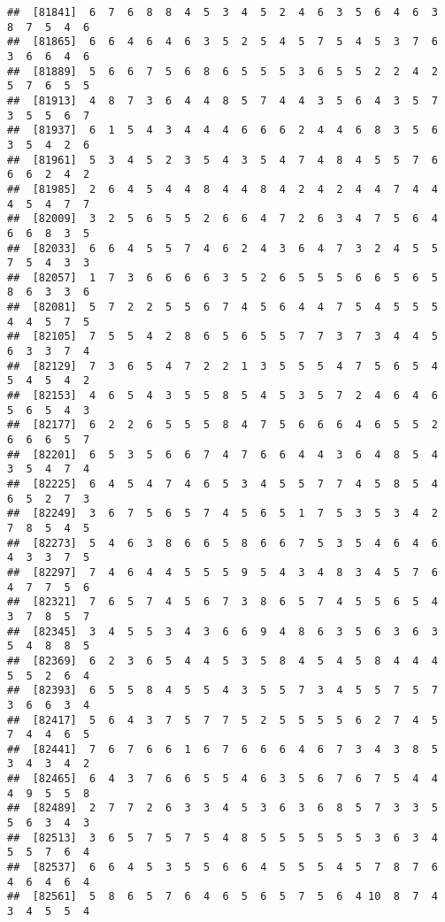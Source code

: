 \documentclass[
]{book}
\begin{document}
\begin{verbatim}
##  [81841]  6  7  6  8  8  4  5  3  4  5  2  4  6  3  5  6  4  6  3  8  7  5  4  6
##  [81865]  6  6  4  6  4  6  3  5  2  5  4  5  7  5  4  5  3  7  6  3  6  6  4  6
##  [81889]  5  6  6  7  5  6  8  6  5  5  5  3  6  5  5  2  2  4  2  5  7  6  5  5
##  [81913]  4  8  7  3  6  4  4  8  5  7  4  4  3  5  6  4  3  5  7  3  5  5  6  7
##  [81937]  6  1  5  4  3  4  4  4  6  6  6  2  4  4  6  8  3  5  6  3  5  4  2  6
##  [81961]  5  3  4  5  2  3  5  4  3  5  4  7  4  8  4  5  5  7  6  6  6  2  4  2
##  [81985]  2  6  4  5  4  4  8  4  4  8  4  2  4  2  4  4  7  4  4  4  5  4  7  7
##  [82009]  3  2  5  6  5  5  2  6  6  4  7  2  6  3  4  7  5  6  4  6  6  8  3  5
##  [82033]  6  6  4  5  5  7  4  6  2  4  3  6  4  7  3  2  4  5  5  7  5  4  3  3
##  [82057]  1  7  3  6  6  6  6  3  5  2  6  5  5  5  6  6  5  6  5  8  6  3  3  6
##  [82081]  5  7  2  2  5  5  6  7  4  5  6  4  4  7  5  4  5  5  5  4  4  5  7  5
##  [82105]  7  5  5  4  2  8  6  5  6  5  5  7  7  3  7  3  4  4  5  6  3  3  7  4
##  [82129]  7  3  6  5  4  7  2  2  1  3  5  5  5  4  7  5  6  5  4  5  4  5  4  2
##  [82153]  4  6  5  4  3  5  5  8  5  4  5  3  5  7  2  4  6  4  6  5  6  5  4  3
##  [82177]  6  2  2  6  5  5  5  8  4  7  5  6  6  6  4  6  5  5  2  6  6  6  5  7
##  [82201]  6  5  3  5  6  6  7  4  7  6  6  4  4  3  6  4  8  5  4  3  5  4  7  4
##  [82225]  6  4  5  4  7  4  6  5  3  4  5  5  7  7  4  5  8  5  4  6  5  2  7  3
##  [82249]  3  6  7  5  6  5  7  4  5  6  5  1  7  5  3  5  3  4  2  7  8  5  4  5
##  [82273]  5  4  6  3  8  6  6  5  8  6  6  7  5  3  5  4  6  4  6  4  3  3  7  5
##  [82297]  7  4  6  4  4  5  5  5  9  5  4  3  4  8  3  4  5  7  6  4  7  7  5  6
##  [82321]  7  6  5  7  4  5  6  7  3  8  6  5  7  4  5  5  6  5  4  3  7  8  5  7
##  [82345]  3  4  5  5  3  4  3  6  6  9  4  8  6  3  5  6  3  6  3  5  4  8  8  5
##  [82369]  6  2  3  6  5  4  4  5  3  5  8  4  5  4  5  8  4  4  4  5  5  2  6  4
##  [82393]  6  5  5  8  4  5  5  4  3  5  5  7  3  4  5  5  7  5  7  3  6  6  3  4
##  [82417]  5  6  4  3  7  5  7  7  5  2  5  5  5  5  6  2  7  4  5  7  4  4  6  5
##  [82441]  7  6  7  6  6  1  6  7  6  6  6  4  6  7  3  4  3  8  5  3  4  3  4  2
##  [82465]  6  4  3  7  6  6  5  5  4  6  3  5  6  7  6  7  5  4  4  4  9  5  5  8
##  [82489]  2  7  7  2  6  3  3  4  5  3  6  3  6  8  5  7  3  3  5  5  6  3  4  3
##  [82513]  3  6  5  7  5  7  5  4  8  5  5  5  5  5  5  3  6  3  4  5  5  7  6  4
##  [82537]  6  6  4  5  3  5  5  6  6  4  5  5  5  4  5  7  8  7  6  4  6  4  6  4
##  [82561]  5  8  6  5  7  6  4  6  5  6  5  7  5  6  4 10  8  7  4  3  4  5  5  4

\end{verbatim}
\end{document}
